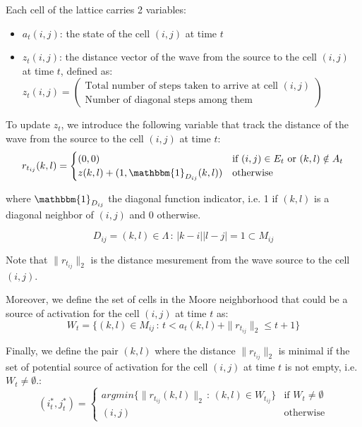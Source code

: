 \documentclass[../main.tex]{subfiles}
\begin{document}
\vspace{1em}

Each cell of the lattice carries 2 variables:
\begin{itemize}
	\item $a_t (i, j)$: the state of the cell $(i, j)$ at time $t$
	\item $z_t (i, j)$: the distance vector of the wave from the source to the cell $(i, j)$ at time $t$, defined as:
	$z_t (i, j) = \begin{pmatrix}
		\text{Total number of steps taken to arrive at cell } (i, j) \\
		\text{Number of diagonal steps among them}
	\end{pmatrix}$
\end{itemize}


\vspace{1em}


To update $z_t$, we introduce the following variable that track the distance of the wave from the source to the cell $(i, j)$ at time $t$: 
$$r_{t_{ij}} (k, l) = \begin{cases}
	(0, 0) & \text{if } (i, j) \in {E}_{t} \text{ or } (k, l) \notin A_t\\
	z(k, l) + (1, \mathbbm{1}_{D_{ij}}(k, l)) & \text{otherwise}
\end{cases}$$

where $\mathbbm{1}_{D_{ij}}$ the diagonal function indicator, i.e. 1 if $(k, l)$ is a diagonal neighbor of $(i, j)$ and $0$ otherwise.

$$D_{ij} = {(k, l) \in \Lambda \,:\, |k - i||l - j| = 1} \subset M_{ij}$$

Note that $\| r_{t_{ij}} \|_2$ is the distance mesurement from the wave source to the cell $(i, j)$.

\vspace{1em}
Moreover, we define the set of cells in the Moore neighborhood that could be a source of activation for the cell $(i, j)$ at time $t$ as:
$$ W_t = \{(k, l) \in M_{ij} \,:\, t < a_t (k, l) + \| r_{t_{ij}} \|_2 \leq t+1\}$$

\vspace{1em}
Finally, we define the pair $(k, l)$ where the distance $\| r_{t_{ij}} \|_2$ is minimal if the set of potential source of activation for the cell $(i, j)$ at time $t$ is not empty, i.e. $W_t \neq \emptyset$.:
$$(i_t^{*}, j_t^{*}) = 
\begin{cases}
	argmin\{\| r_{t_{ij}} (k, l)\|_2 \,:\, (k, l) \in W_{t_{ij}}\} & \text{if }  W_t \neq \emptyset\\
	(i, j) & \text{otherwise}
\end{cases}
$$
\end{document}
